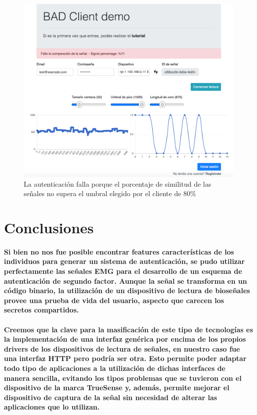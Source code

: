 \documentclass{article}
\begin{document}
\begin{figure}[ht]
    \centering
    \includegraphics[width=\textwidth]{error_1_res.png}%
    \caption{La autenticación falla porque el porcentaje de similitud de las señales no supera el umbral elegido por el cliente de 80\%}
    \label{fig:error-1}
\end{figure}

\section{Conclusiones}
\paragraph{
Si bien no nos fue posible encontrar features características de los individuos para generar un sistema de autenticación, se pudo utilizar perfectamente las señales EMG para el desarrollo de un esquema de autenticación de segundo factor. Aunque la señal se transforma en un código binario, la utilización de un dispositivo de lectura de bioseñales provee una prueba de vida del usuario, aspecto que carecen los secretos compartidos.
}
\paragraph{
Creemos que la clave para la masificación de este tipo de tecnologías es la implementación de una interfaz genérica por encima de los propios drivers de los dispositivos de lectura de señales, en nuestro caso fue una interfaz HTTP pero podría ser otra. Esto permite poder adaptar todo tipo de aplicaciones a la utilización de dichas interfaces de manera sencilla, evitando los tipos problemas que se tuvieron con el dispositivo de la marca TrueSense y, además, permite mejorar el dispositivo de captura de la señal sin necesidad de alterar las aplicaciones que lo utilizan.
}
\end{document}
